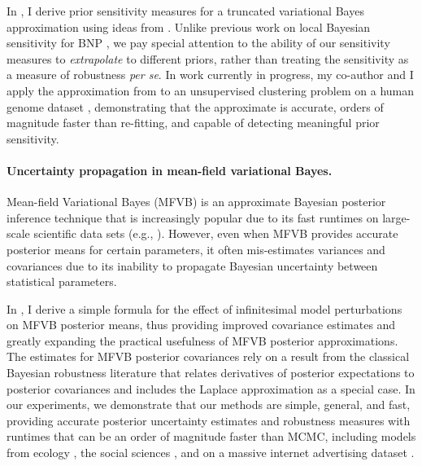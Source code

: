 In \citep{giordano:2018:bnpsensitivity}, I derive prior sensitivity measures for
a truncated variational Bayes approximation using ideas from \citep{gustafson:1996:localposterior,
giordano:2018:covariances}. Unlike previous work on local Bayesian sensitivity
for BNP \citep{Basu:2000:BNP_robustness}, we pay special attention to the
ability of our sensitivity measures to \emph{extrapolate} to different priors,
rather than treating the sensitivity as a measure of robustness \textit{per se}.
In work currently in progress, my co-author and I apply the approximation from
\citep{giordano:2018:bnpsensitivity} to an unsupervised clustering problem on a
human genome dataset \citep{huang:2011:haplotype, raj:2014:faststructure},
demonstrating that the approximate is accurate, orders of magnitude faster than
re-fitting, and capable of detecting meaningful prior sensitivity.


\paragraph{Uncertainty propagation in mean-field variational Bayes.}

Mean-field Variational Bayes (MFVB) is an approximate Bayesian posterior
inference technique that is increasingly popular due to its fast runtimes on
large-scale scientific data sets (e.g., \citet{raj:2014:faststructure,
kucukelbir:2017:advi, regier:2019:cataloging}). However, even when MFVB provides
accurate posterior means for certain parameters, it often mis-estimates
variances and covariances \citep{wang:2005:inadequacy, turner:2011:two} due to
its inability to propagate Bayesian uncertainty between statistical parameters.

In \citet{giordano:2015:linear, giordano:2018:covariances}, I derive a simple
formula for the effect of infinitesimal model perturbations on MFVB posterior
means, thus providing improved covariance estimates and greatly expanding the
practical usefulness of MFVB posterior approximations. The estimates for MFVB
posterior covariances rely on a result from the classical Bayesian robustness
literature that relates derivatives of posterior expectations to posterior
covariances and includes the Laplace approximation as a special case.
In our experiments, we demonstrate that our methods are simple, general, and
fast, providing accurate posterior uncertainty estimates and robustness measures
with runtimes that can be an order of magnitude faster than MCMC, including
models from ecology \citep{kery:2011:bayesian}, the social sciences
\citep{gelman:2006:arm}, and on a massive internet advertising dataset
\citep{criteo:2014:dataset}.




